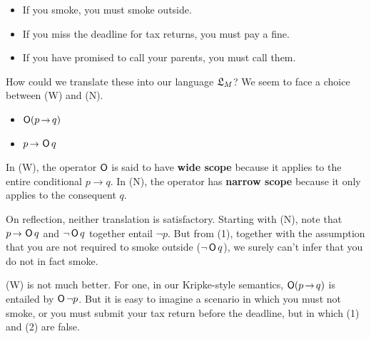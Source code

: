 \begin{itemize}[leftmargin=10mm]
\itemsep-1mm
\item[(1)] If you smoke, you must smoke outside.
\item[(2)] If you miss the deadline for tax returns, you must pay a fine.
\item[(3)] If you have promised to call your parents, you must call them.
\end{itemize}
%
How could we translate these into our language $\mathfrak{L}_M$? We seem to face a choice
between (W) and (N).
\begin{itemize}[leftmargin=10mm]
\itemsep-1mm
\item[(W)] $\Ob(p \to q)$
\item[(N)] $p \to \Ob q$
\end{itemize}
In (W), the operator $\operatorname{\mathsf{O}}$ is said to have \textbf{wide scope} because it
applies to the entire conditional $p \to q$. In (N), the operator has
\textbf{narrow scope} because it only applies to the consequent $q$.

On reflection, neither translation is satisfactory. Starting with (N), note that
$p \to \Ob q$ and $\neg \operatorname{\mathsf{O}} q$ together entail $\neg p$. But from (1), together
with the assumption that you are not required to smoke outside ($\neg \operatorname{\mathsf{O}} q$), we surely
can't infer that you do not in fact smoke.

%

(W) is not much better. For one, in our Kripke-style semantics, $\Ob(p \to q)$
is entailed by $\operatorname{\mathsf{O}}\neg p$. But it is easy to imagine a scenario in which you
must not smoke, or you must submit your tax return before the deadline, but in
which (1) and (2) are false.


